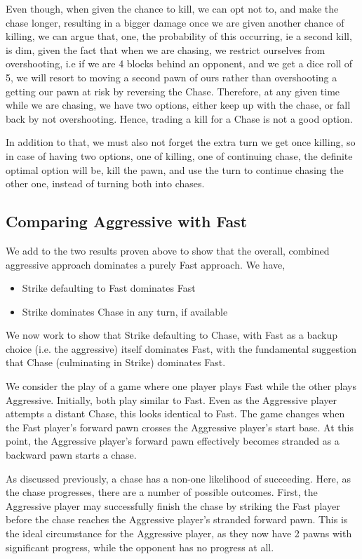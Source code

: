 \documentclass{article} %
\begin{document}
Even though, when given the chance to kill, we can opt not to, and make the chase longer, resulting in a bigger damage once we are given another chance of killing, we can argue that, one, the probability of this occurring, ie a second kill, is dim, given the fact that when we are chasing, we restrict ourselves from overshooting, i.e if we are 4 blocks behind an opponent, and we get a dice roll of 5, we will resort to moving a second pawn of ours rather than overshooting a getting our pawn at risk by reversing the Chase. Therefore, at any given time while we are chasing, we have two options, either keep up with the chase, or fall back by not overshooting. Hence, trading a kill for a Chase is not a good option.

In addition to that, we must also not forget the extra turn we get once killing, so in case of having two options, one of killing, one of continuing chase, the definite optimal option will be, kill the pawn, and use the turn to continue chasing the other one, instead of turning both into chases.

\subsection{Comparing Aggressive with Fast}
We add to the two results proven above to show that the overall, combined aggressive approach dominates a purely Fast approach. We have,
\begin{itemize}
\item Strike defaulting to Fast dominates Fast
\item Strike dominates Chase in any turn, if available
\end{itemize}
	
We now work to show that Strike defaulting to Chase, with Fast as a backup choice (i.e. the aggressive) itself dominates Fast, with the fundamental suggestion that Chase (culminating in Strike) dominates Fast.

We consider the play of a game where one player plays Fast while the other plays Aggressive. Initially, both play similar to Fast. Even as the Aggressive player attempts a distant Chase, this looks identical to Fast. The game changes when the Fast player’s forward pawn crosses the Aggressive player’s start base. At this point, the Aggressive player’s forward pawn effectively becomes stranded as a backward pawn starts a chase.

As discussed previously, a chase has a non-one likelihood of succeeding. Here, as the chase progresses, there are a number of possible outcomes. First, the Aggressive player may successfully finish the chase by striking the Fast player before the chase reaches the Aggressive player’s stranded forward pawn. This is the ideal circumstance for the Aggressive player, as they now have 2 pawns with significant progress, while the opponent has no progress at all.
\end{document}
